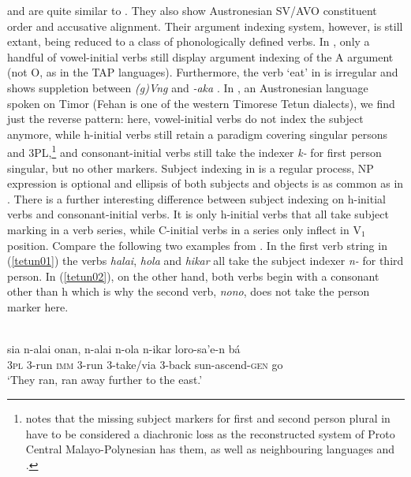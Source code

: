 \largerpage[-1]
 and  are quite similar to . They also show Austronesian SV/AVO constituent order and accusative alignment. Their argument indexing system, however, is still extant, being reduced to a class of phonologically defined verbs. In , only a handful of vowel-initial verbs still display argument indexing of the A argument (not O, as in the TAP languages). Furthermore, the verb `eat' in  is irregular and shows suppletion between \textit{(g)Vng} and \textit{-aka} \citep[61]{klamer2011alorese}. In , an Austronesian language spoken on Timor (Fehan is one of the western Timorese Tetun dialects), we find just the reverse pattern: here, vowel-initial verbs do not index the subject anymore, while h-initial verbs still retain a paradigm covering singular persons and 3PL,\footnote{\citet[173 footnote 5]{vanklinken1999grammar} notes that the missing subject markers for first and second person plural in  have to be considered a diachronic loss as the reconstructed system of Proto Central Malayo-Polynesian has them, as well as neighbouring languages  and .} and consonant-initial verbs still take the indexer \textit{k-} for first person singular, but no other markers. Subject indexing in  is a regular process, NP expression is optional and ellipsis of both subjects and objects is as common as in . There is a further interesting difference between subject indexing on h-initial verbs and consonant-initial verbs. It is only h-initial verbs that all take subject marking in a verb series, while C-initial verbs in a series only inflect in V$_1$ position. Compare the following two examples from \citet{vanklinken1999grammar}. In the first verb string in (\ref{tetun01}) the verbs \textit{halai}, \textit{hola} and \textit{hikar} all take the subject indexer \textit{n-} for third person. In (\ref{tetun02}), on the other hand, both verbs begin with a consonant other than h which is why the second verb, \textit{nono}, does not take the person marker here.

\ea \label{tetun01}
\\
\gll sia n-alai onan, n-alai n-ola n-ikar loro-sa'e-n bá \\
\textsc{3}\textsc{pl} \textsc{3}-run \textsc{imm} \textsc{3}-run \textsc{3}-take/via \textsc{3}-back sun-ascend-\textsc{gen} go \\
\glft `They ran, ran away further to the east.'
\z

